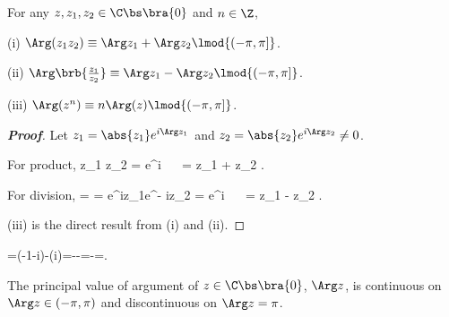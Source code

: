 \begin{proposition}
For any $z,z_1,z_2\in \C\bs\bra{0}$ and $n\in \Z$,
\ben
\item [(i)] $\Arg(z_1z_2) \equiv \Arg z_1 + \Arg z_2 \lmod{(-\pi,\pi]}$.
\item [(ii)] $\Arg\brb{\frac{z_1}{z_2}} \equiv \Arg z_1 - \Arg z_2 \lmod{(-\pi,\pi]}$.
\item [(iii)] $\Arg(z^n) \equiv n\Arg(z)\lmod{(-\pi,\pi]}$.
\een
\end{proposition}


\begin{proof}[\bf Proof]
Let $z_1 = \abs{z_1}e^{i\Arg z_1}$ and $z_2 = \abs{z_2}e^{i\Arg z_2} \neq 0$.

For product,
\beast
z_1 z_2 = e^{i}  \ \ra\ \Arg{} = \Arg z_1 + \Arg z_2 \lmod{(-\pi,\pi]}.
\eeast

For division,
\beast
{} =  = e^{i\Arg z_1}e^{- i\Arg z_2} = e^{i}  \ \ra\ \Arg{} = \Arg z_1 - \Arg z_2 \lmod{(-\pi,\pi]}.
\eeast

(iii) is the direct result from (i) and (ii).
\end{proof}

\begin{example}
\be
{}=(-1-i)-(i)=-{}-{}=-{}={}{\pmod  {(-\pi ,\pi ]}}.
\ee
\end{example}



\begin{theorem}\label{thm:principal_value_argument_continuous_discontinuous}
The principal value of argument of $z\in \C\bs\bra{0}$, $\Arg z$, is continuous on $\Arg z\in (-\pi,\pi)$ and discontinuous on $\Arg z = \pi$.
\end{theorem}

